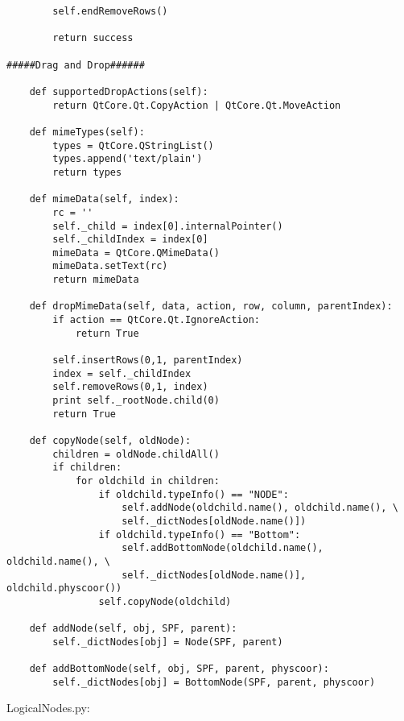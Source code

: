 \begin{verbatim}
        self.endRemoveRows()

        return success

#####Drag and Drop######

    def supportedDropActions(self):
        return QtCore.Qt.CopyAction | QtCore.Qt.MoveAction

    def mimeTypes(self):
        types = QtCore.QStringList()
        types.append('text/plain')
        return types

    def mimeData(self, index):  
        rc = ''
        self._child = index[0].internalPointer()
        self._childIndex = index[0]
        mimeData = QtCore.QMimeData()
        mimeData.setText(rc)
        return mimeData

    def dropMimeData(self, data, action, row, column, parentIndex):
        if action == QtCore.Qt.IgnoreAction:
            return True
        
        self.insertRows(0,1, parentIndex)
        index = self._childIndex
        self.removeRows(0,1, index)
        print self._rootNode.child(0)
        return True

    def copyNode(self, oldNode):
        children = oldNode.childAll()
        if children:
            for oldchild in children:
                if oldchild.typeInfo() == "NODE":
                    self.addNode(oldchild.name(), oldchild.name(), \
                    self._dictNodes[oldNode.name()])
                if oldchild.typeInfo() == "Bottom":
                    self.addBottomNode(oldchild.name(), oldchild.name(), \
                    self._dictNodes[oldNode.name()], oldchild.physcoor())
                self.copyNode(oldchild)
    
    def addNode(self, obj, SPF, parent):
        self._dictNodes[obj] = Node(SPF, parent)

    def addBottomNode(self, obj, SPF, parent, physcoor):
        self._dictNodes[obj] = BottomNode(SPF, parent, physcoor)
\end{verbatim}

LogicalNodes.py:

